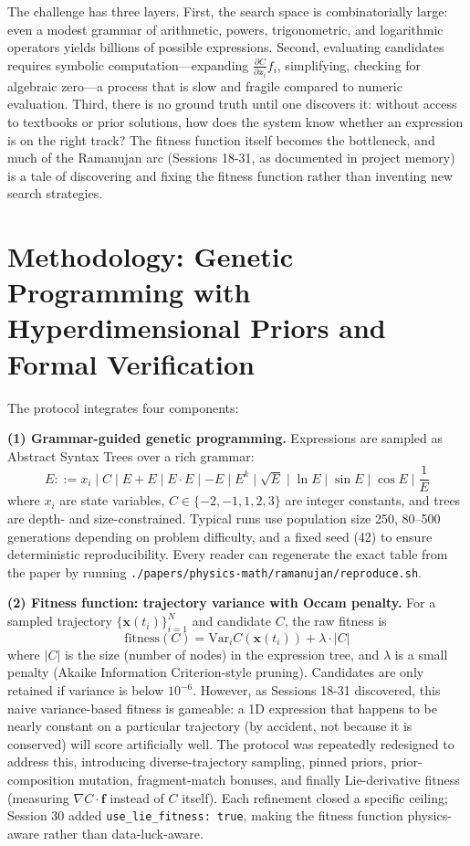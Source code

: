 The challenge has three layers. First, the search space is combinatorially large: even a modest grammar of arithmetic, powers, trigonometric, and logarithmic operators yields billions of possible expressions. Second, evaluating candidates requires symbolic computation---expanding $\frac{\partial C}{\partial x_i} f_i$, simplifying, checking for algebraic zero---a process that is slow and fragile compared to numeric evaluation. Third, there is no ground truth until one discovers it: without access to textbooks or prior solutions, how does the system know whether an expression is on the right track? The fitness function itself becomes the bottleneck, and much of the Ramanujan arc (Sessions 18-31, as documented in project memory) is a tale of discovering and fixing the fitness function rather than inventing new search strategies.

\section{Methodology: Genetic Programming with Hyperdimensional Priors and Formal Verification}

The protocol integrates four components:

\textbf{(1) Grammar-guided genetic programming.} Expressions are sampled as Abstract Syntax Trees over a rich grammar:
\begin{equation}
E ::= x_i \mid C \mid E + E \mid E \cdot E \mid -E \mid E^k \mid \sqrt{E} \mid \ln E \mid \sin E \mid \cos E \mid \frac{1}{E}
\end{equation}
where $x_i$ are state variables, $C \in \{-2, -1, 1, 2, 3\}$ are integer constants, and trees are depth- and size-constrained. Typical runs use population size 250, 80--500 generations depending on problem difficulty, and a fixed seed (42) to ensure deterministic reproducibility. Every reader can regenerate the exact table from the paper by running \texttt{./papers/physics-math/ramanujan/reproduce.sh}.

\textbf{(2) Fitness function: trajectory variance with Occam penalty.} For a sampled trajectory $\{\mathbf{x}(t_i)\}_{i=1}^N$ and candidate $C$, the raw fitness is
\begin{equation}
\text{fitness}(C) = \text{Var}_i C(\mathbf{x}(t_i)) + \lambda \cdot |C|
\end{equation}
where $|C|$ is the size (number of nodes) in the expression tree, and $\lambda$ is a small penalty (Akaike Information Criterion-style pruning). Candidates are only retained if variance is below $10^{-6}$. However, as Sessions 18-31 discovered, this naive variance-based fitness is gameable: a 1D expression that happens to be nearly constant on a particular trajectory (by accident, not because it is conserved) will score artificially well. The protocol was repeatedly redesigned to address this, introducing diverse-trajectory sampling, pinned priors, prior-composition mutation, fragment-match bonuses, and finally Lie-derivative fitness (measuring $\nabla C \cdot \mathbf{f}$ instead of $C$ itself). Each refinement closed a specific ceiling; Session 30 added \texttt{use\_lie\_fitness: true}, making the fitness function physics-aware rather than data-luck-aware.

